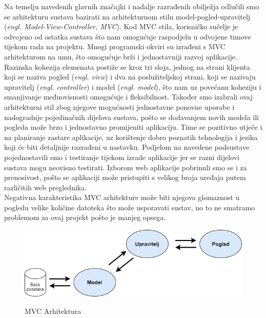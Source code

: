 	\textnormal{Na temelju navedenih glavnih značajki i nadalje razrađenih obilježja odlučili smo se arhitekturu sustava bazirati na arhitekturnom stilu model-pogled-upravitelj (\textit{engl. Model-View-Controller, MVC}). Kod MVC stila, korisničko sučelje je odvojeno od ostatka sustava što nam omogućuje raspodjelu u odvojene timove tijekom rada na projektu. Mnogi programski okviri su izrađeni s MVC arhitekturom na umu, što omogućuje brži i jednostavniji razvoj aplikacije. Razinska kohezija elemenata postiže se kroz tri sloja, jednog na strani klijenta koji se naziva pogled (\textit{engl. view}) i dva na poslužiteljskoj strani, koji se nazivaju upravitelj (\textit{engl. controller}) i model (\textit{engl. model}), što nam uz povećanu koheziju i smanjivanje međuovisnosti omogućuje i fleksibilnost. Također smo izabrali ovaj arhitekturni stil zbog njegove mogućnosti jednostavne ponovne uporabe i nadogradnje pojedinačnih dijelova sustava, pošto se dodavanjem novih modela ili pogleda može brzo i jednostavno promijeniti aplikaciju. Time se pozitivno utječe i na planiranje zastare aplikacije, uz korištenje dobro poznatih tehnologija i jezika koji će biti detaljnije razrađeni u nastavku. Podjelom na navedene podsustave pojednostavili smo i testiranje tijekom izrade aplikacije jer se razni dijelovi sustava mogu neovisno testirati. Izborom web aplikacije pobrinuli smo se i za prenosivost, pošto se aplikaciji može pristupiti s velikog broja uređaja putem različitih web preglednika.}\\
	
	\textnormal{Negativna karakteristika MVC arhitekture može biti njegova glomaznost u pogledu velike količine datoteka što može usporavati sustav, no to ne smatramo problemom za ovaj projekt pošto je manjeg opsega.}\\
	
	\begin{figure}[H]
		\centering
		\includegraphics[scale=0.5]{slike/MVC} \\
		\caption{ MVC Arhitektura}
		\label{fig:arhitekturaMCV}
	\end{figure}

